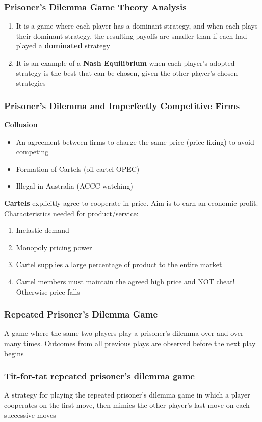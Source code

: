 \subsubsection{Prisoner's Dilemma Game Theory Analysis}
\begin{enumerate}
	\item It is a game where each player has a dominant strategy, and when each plays their dominant strategy, the resulting payoffs are smaller than if each had played a \textbf{dominated} strategy
	\item It is an example of a \textbf{Nash Equilibrium} when each player's adopted strategy is the best that can be chosen, given the other player's chosen strategies
\end{enumerate}
\subsubsection{Prisoner's Dilemma and Imperfectly Competitive Firms}
\textbf{Collusion}
\begin{itemize}
	\item An agreement between firms to charge the same price (price fixing) to avoid competing
	\item Formation of Cartels (oil cartel OPEC)
	\item Illegal in Australia (ACCC watching)
\end{itemize}
\textbf{Cartels} explicitly agree to cooperate in price. Aim is to earn an economic profit. Characteristics needed for product/service:
\begin{enumerate}
	\item Inelastic demand
	\item Monopoly pricing power
	\item Cartel supplies a large percentage of product to the entire market
	\item Cartel members must maintain the agreed high price and NOT cheat! Otherwise price falls
\end{enumerate}
\subsubsection{Repeated Prisoner's Dilemma Game}
A game where the same two players play a prisoner's dilemma over and over many times. Outcomes from all previous plays are observed before the next play begins
\subsubsection{Tit-for-tat repeated prisoner's dilemma game}
A strategy for playing the repeated prisoner's dilemma game in which a player cooperates on the first move, then mimics the other player's last move on each successive moves
